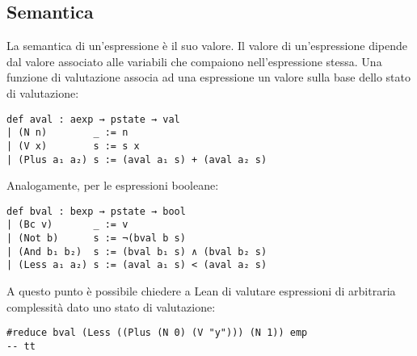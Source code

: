 \begin{comment}
Una semplice espressione booleana di confronto tra espressioni aritmetiche é codificabile come segue:
\begin{verbatim}
Less ((Plus (V "x") (V "y"))) (N 1)
\end{verbatim}
\end{comment}

\subsection{Semantica}
La semantica di un'espressione è il suo valore. Il valore di un'espressione dipende dal valore associato alle variabili che compaiono nell'espressione stessa. Una funzione di valutazione associa ad una espressione un valore sulla base dello stato di valutazione:
\begin{verbatim}
def aval : aexp → pstate → val
| (N n)        _ := n
| (V x)        s := s x
| (Plus a₁ a₂) s := (aval a₁ s) + (aval a₂ s)
\end{verbatim}
Analogamente, per le espressioni booleane:
\begin{verbatim}
def bval : bexp → pstate → bool
| (Bc v)       _ := v
| (Not b)      s := ¬(bval b s)
| (And b₁ b₂)  s := (bval b₁ s) ∧ (bval b₂ s)
| (Less a₁ a₂) s := (aval a₁ s) < (aval a₂ s)
\end{verbatim}
A questo punto è possibile chiedere a Lean di valutare espressioni di arbitraria complessità dato uno stato di valutazione:
\begin{verbatim}
#reduce bval (Less ((Plus (N 0) (V "y"))) (N 1)) emp
-- tt
\end{verbatim}

